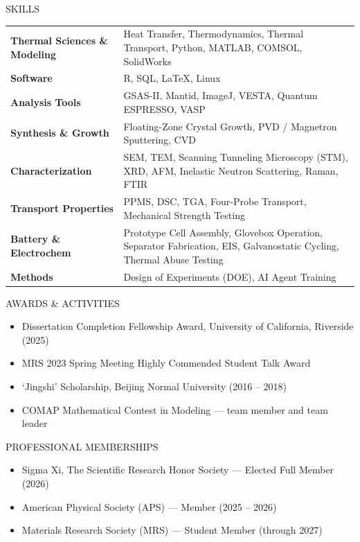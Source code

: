 \documentclass{resume} %
\begin{document}
\begin{rSection}{SKILLS}

\begin{tabularx}{\linewidth}{@{} >{\bfseries}p{1.55in} X @{}}
Thermal Sciences \& Modeling & Heat Transfer, Thermodynamics, Thermal Transport, Python, MATLAB, COMSOL, SolidWorks \\[4pt]
Software & R, SQL, LaTeX, Linux \\[4pt]
Analysis Tools & GSAS-II, Mantid, ImageJ, VESTA, Quantum ESPRESSO, VASP \\[4pt]
Synthesis \& Growth & Floating-Zone Crystal Growth, PVD / Magnetron Sputtering, CVD \\[4pt]
Characterization & SEM, TEM, Scanning Tunneling Microscopy (STM), XRD, AFM, Inelastic Neutron Scattering, Raman, FTIR \\[4pt]
Transport Properties & PPMS, DSC, TGA, Four-Probe Transport, Mechanical Strength Testing \\[4pt]
Battery \& Electrochem & Prototype Cell Assembly, Glovebox Operation, Separator Fabrication, EIS, Galvanostatic Cycling, Thermal Abuse Testing \\[4pt]
Methods & Design of Experiments (DOE), AI Agent Training
\end{tabularx}

\end{rSection}

\begin{rSection}{AWARDS \& ACTIVITIES}
\begin{itemize}
\itemsep 0.1em
\item Dissertation Completion Fellowship Award, University of California, Riverside (2025)
\item MRS 2023 Spring Meeting Highly Commended Student Talk Award
\item `Jingshi' Scholarship, Beijing Normal University (2016 -- 2018)
\item COMAP Mathematical Contest in Modeling --- team member and team leader
\end{itemize}
\end{rSection}

\begin{rSection}{PROFESSIONAL MEMBERSHIPS}
\begin{itemize}
\itemsep 0.1em
\item Sigma Xi, The Scientific Research Honor Society --- Elected Full Member (2026)
\item American Physical Society (APS) --- Member (2025 -- 2026)
\item Materials Research Society (MRS) --- Student Member (through 2027)
\end{itemize}
\end{rSection}
\end{document}
